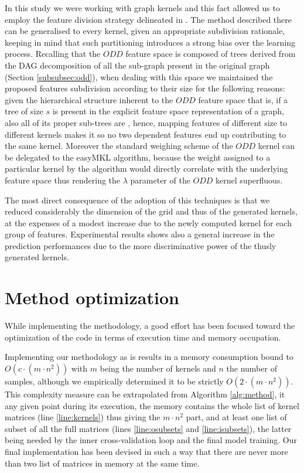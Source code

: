 In this study we were working with graph kernels and this fact allowed us to employ
the feature division strategy delineated in \cite{gmkl}.
The method described there can be generalised to every kernel, given an appropriate
subdivision rationale, keeping in mind that such partitioning introduces a strong
bias over the learning process.
Recalling that the $ODD$ feature space is composed of trees derived from the DAG
decomposition of all the sub-graph present in the original graph (Section \ref{subsubsec:odd}),
when dealing with this space we maintained the proposed features subdivision
according to their size for the following reasons:
given the hierarchical structure inherent to the $ODD$ feature space that is, if a tree
of size $s$ is present in the explicit feature space representation of a graph,
also all of its proper sub-trees are \cite{gmkl},
hence, mapping features of different size to different kernels makes it so no two
dependent features end up contributing to the same kernel.
Moreover the standard weighing scheme of the $ODD$ kernel can be delegated to
the easyMKL algorithm, because the weight assigned to a
particular kernel by the algorithm would directly correlate with the underlying
feature space thus rendering the $\lambda$ parameter of the $ODD$ kernel superfluous.

The most direct consequence of the adoption of this techniques is that we reduced
considerably the dimension of the grid and thus of the generated kernels, at
the expenses of a modest increase due to the newly computed kernel for each group
of features.
Experimental results shows also a general increase in the prediction performances
due to the more discriminative power of the thusly generated kernels.


\section{Method optimization}
\label{sec:opt}

While implementing the methodology, a good effort has been focused toward the
optimization of the code in terms of execution time and memory occupation.

Implementing our methodology as is results in a memory consumption bound to
$O(c \cdot (m\cdot n^2))$ with $m$ being the number of kernels and $n$ the number of samples,
although we empirically determined it to be strictly $O(2\cdot (m\cdot n^2))$.
This complexity measure can be extrapolated from  Algorithm \ref{alg:method},
it any given point during its execution, the memory contains the whole list
of kernel matrices (line \ref{line:kernels}) thus giving the $m\cdot n^2$ part,
and at least one list of subset of all the full matrices (lines \ref{line:osubsets}
and \ref{line:isubsets}), the latter being needed by the inner cross-validation
loop and the final model training.  Our final implementation has been devised in
such a way that there are never more than two list of matrices in memory at the
same time.  

